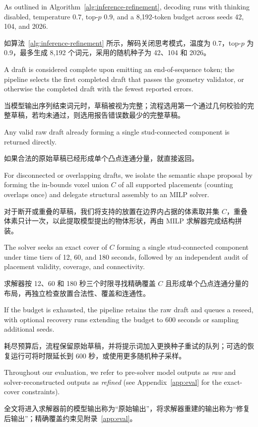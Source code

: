 \documentclass[11pt,letterpaper]{article}
\newcommand{\pair}[2]{\par\addvspace{4pt}\noindent
  \begin{minipage}{\linewidth}\raggedright
  #1\par\nobreak\vspace{1pt}
  {\color{translation}\chinesefont\fontsize{10.5}{15.3}\selectfont #2\par}
  \end{minipage}\par}
\begin{document}
\pair{As outlined in Algorithm~\ref{alg:inference-refinement}, decoding runs with thinking disabled, temperature $0.7$, top-$p$ $0.9$, and a 8,192-token budget across seeds 42, 104, and 2026.}{如算法~\ref{alg:inference-refinement} 所示，解码关闭思考模式，温度为 0.7，top-$p$ 为 0.9，最多生成 8,192 个词元，采用的随机种子为 42、104 和 2026。}

\pair{A draft is considered complete upon emitting an end-of-sequence token; the pipeline selects the first completed draft that passes the geometry validator, or otherwise the completed draft with the fewest reported errors.}{当模型输出序列结束词元时，草稿被视为完整；流程选用第一个通过几何校验的完整草稿，若均未通过，则选用报告错误数最少的完整草稿。}

\pair{Any valid raw draft already forming a single stud-connected component is returned directly.}{如果合法的原始草稿已经形成单个凸点连通分量，就直接返回。}

\pair{For disconnected or overlapping drafts, we isolate the semantic shape proposal by forming the in-bounds voxel union $C$ of all supported placements (counting overlaps once) and delegate structural assembly to an MILP solver.}{对于断开或重叠的草稿，我们将支持的放置在边界内占据的体素取并集 $C$，重叠体素只计一次，以此提取模型提出的物体形状，再由 MILP 求解器完成结构拼装。}

\pair{The solver seeks an exact cover of $C$ forming a single stud-connected component under time tiers of 12, 60, and 180 seconds, followed by an independent audit of placement validity, coverage, and connectivity.}{求解器按 12、60 和 180 秒三个时限寻找精确覆盖 $C$ 且形成单个凸点连通分量的布局，再独立检查放置合法性、覆盖和连通性。}

\pair{If the budget is exhausted, the pipeline retains the raw draft and queues a reseed, with optional recovery runs extending the budget to 600 seconds or sampling additional seeds.}{耗尽预算后，流程保留原始草稿，并将提示词加入更换种子重试的队列；可选的恢复运行可将时限延长到 600 秒，或使用更多随机种子采样。}

\pair{Throughout our evaluation, we refer to pre-solver model outputs as \emph{raw} and solver-reconstructed outputs as \emph{refined} (see Appendix~\ref{app:eval} for the exact-cover constraints).}{全文将进入求解器前的模型输出称为“原始输出”，将求解器重建的输出称为“修复后输出”；精确覆盖约束见附录~\ref{app:eval}。}
\end{document}
